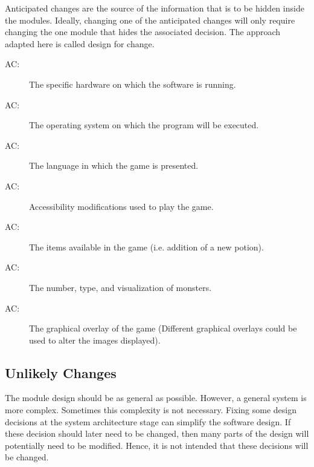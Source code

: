 \documentclass[12pt, titlepage]{article}
\newcounter{acnum}
\newcommand{\actheacnum}{AC\theacnum}
\begin{document}
        Anticipated changes are the source of the information that is to be hidden inside the modules. Ideally, changing one of the anticipated changes will only require changing the one module that hides the associated decision. The approach adapted here is called design for change.

        \bigskip\begin{description}
            \item[ \actheacnum \label{acHardware}:] The specific hardware on which the software is running.
            \item[ \actheacnum \label{acOs}:] The operating system on which the program will be executed.
            \item[ \actheacnum \label{acLanguage}:] The language in which the game is presented.
            \item[ \actheacnum \label{acAccessibility}:] Accessibility modifications used to play the game.
            \item[ \actheacnum \label{acItems}:] The items available in the game (i.e. addition of a new potion).
            \item[ \actheacnum \label{acMonsters}:] The number, type, and visualization of monsters.
            \item[ \actheacnum \label{acVisuals}:] The graphical overlay of the game (Different graphical overlays could be used to alter the images displayed).
        \end{description}

    \subsection{Unlikely Changes} \label{SecUchange}

        The module design should be as general as possible. However, a general system is more complex. Sometimes this complexity is not necessary. Fixing some design decisions at the system architecture stage can simplify the software design. If these decision should later need to be changed, then many parts of the design will potentially need to be modified. Hence, it is not intended that these decisions will be changed.
\end{document}
